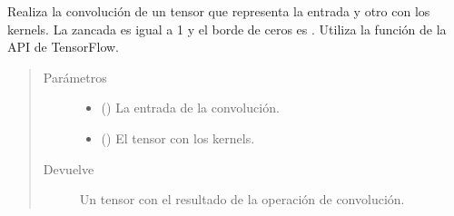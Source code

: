 \begin{fulllineitems}
\label{\detokenize{model_desc:cnn_indoor_classifier_model.conv2d}}
Realiza la convolución de un tensor que representa la entrada
y otro con los kernels. La zancada es igual a 1 y el borde de
ceros es . Utiliza la función  de la API de
TensorFlow.
\begin{quote}\begin{description}
\item[{Parámetros}] \leavevmode\begin{itemize}
\item {} 
 () \textendash{} La entrada de la convolución.

\item {} 
 () \textendash{} El tensor con los kernels.

\end{itemize}

\item[{Devuelve}] \leavevmode
Un tensor con el resultado de la operación de convolución.

\end{description}\end{quote}

\end{fulllineitems}


